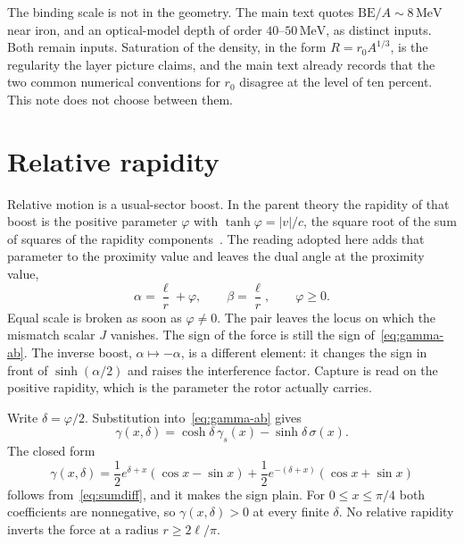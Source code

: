 \documentclass[a4paper]{article}
\begin{document}
The binding scale is not in the geometry. The main text quotes \(\mathrm{BE}/A\sim 8\,\mathrm{MeV}\) near iron, and an optical-model depth of order \(40\)--\(50\,\mathrm{MeV}\), as distinct inputs. Both remain inputs. Saturation of the density, in the form \(R=r_0 A^{1/3}\), is the regularity the layer picture claims, and the main text already records that the two common numerical conventions for \(r_0\) disagree at the level of ten percent. This note does not choose between them.

\section{Relative rapidity}
\label{sec:rapidity}

Relative motion is a usual-sector boost. In the parent theory the rapidity of that boost is the positive parameter \(\varphi\) with \(\tanh\varphi=|v|/c\), the square root of the sum of squares of the rapidity components~\cite{dst-main}. The reading adopted here adds that parameter to the proximity value and leaves the dual angle at the proximity value,
\begin{equation}
\label{eq:ansatz}
\alpha=\frac{\ell}{r}+\varphi,
\qquad
\beta=\frac{\ell}{r},
\qquad
\varphi\ge 0.
\end{equation}
Equal scale is broken as soon as \(\varphi\neq 0\). The pair leaves the locus on which the mismatch scalar \(J\) vanishes. The sign of the force is still the sign of~\eqref{eq:gamma-ab}. The inverse boost, \(\alpha\mapsto-\alpha\), is a different element: it changes the sign in front of \(\sinh(\alpha/2)\) and raises the interference factor. Capture is read on the positive rapidity, which is the parameter the rotor actually carries.

Write \(\delta=\varphi/2\). Substitution into~\eqref{eq:gamma-ab} gives
\begin{equation}
\label{eq:gamma-phi}
\gamma(x,\delta)
  =\cosh\delta\,\gamma_s(x)-\sinh\delta\,\sigma(x).
\end{equation}
The closed form
\begin{equation}
\label{eq:gamma-closed}
\gamma(x,\delta)
  =\frac12 e^{\delta+x}(\cos x-\sin x)
  +\frac12 e^{-(\delta+x)}(\cos x+\sin x)
\end{equation}
follows from~\eqref{eq:sumdiff}, and it makes the sign plain. For \(0\le x\le\pi/4\) both coefficients are nonnegative, so \(\gamma(x,\delta)>0\) at every finite \(\delta\). No relative rapidity inverts the force at a radius \(r\ge 2\ell/\pi\).
\end{document}
